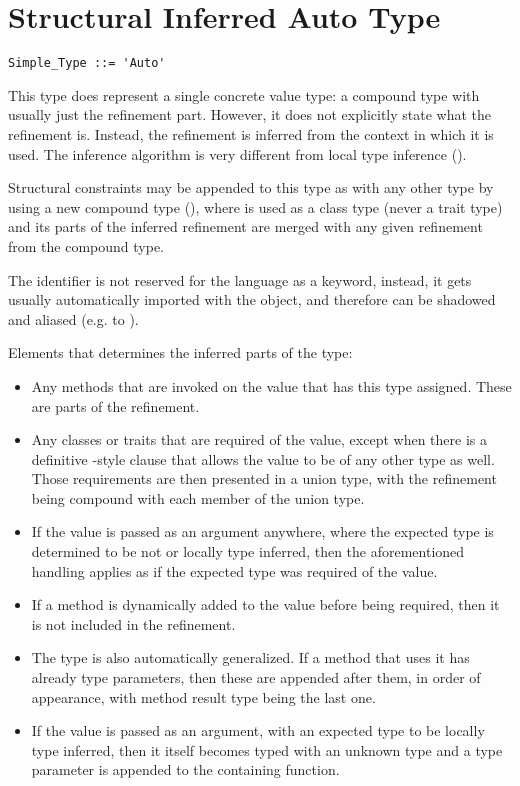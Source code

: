 \section{Structural Inferred Auto Type}
\label{sec:auto-type}

\syntax\begin{lstlisting}[morekeywords={Auto}]
Simple_Type ::= 'Auto'
\end{lstlisting}

This type does represent a single concrete value type: a compound type with usually just the refinement part. However, it does not explicitly state what the refinement is. Instead, the refinement is inferred from the context in which it is used. The inference algorithm is very different from local type inference (). 

Structural constraints may be appended to this type as with any other type by using a new compound type (), where  is used as a class type (never a trait type) and its parts of the inferred refinement are merged with any given refinement from the compound type. 

The  identifier is not reserved for the language as a keyword, instead, it gets usually automatically imported with the  object, and therefore can be shadowed and aliased (e.g. to ). 

Elements that determines the inferred parts of the  type:

\begin{itemize}
  \item Any methods that are invoked on the value that has this type assigned. These are parts of the refinement. 
  \item Any classes or traits that are required of the value, except when there is a definitive -style clause that allows the value to be of any other type as well. Those requirements are then presented in a union type, with the refinement being compound with each member of the union type. 
  \item If the value is passed as an argument anywhere, where the expected type is determined to be not  or locally type inferred, then the aforementioned handling applies as if the expected type was required of the value.
  \item If a method is dynamically added to the value before being required, then it is not included in the refinement. 
  \item The  type is also automatically generalized. If a method that uses it has already type parameters, then these are appended after them, in order of appearance, with method result type being the last one. 
  \item If the value is passed as an argument, with an expected type to be locally type inferred, then it itself becomes typed with an unknown type and a type parameter is appended to the containing function.
\end{itemize}

